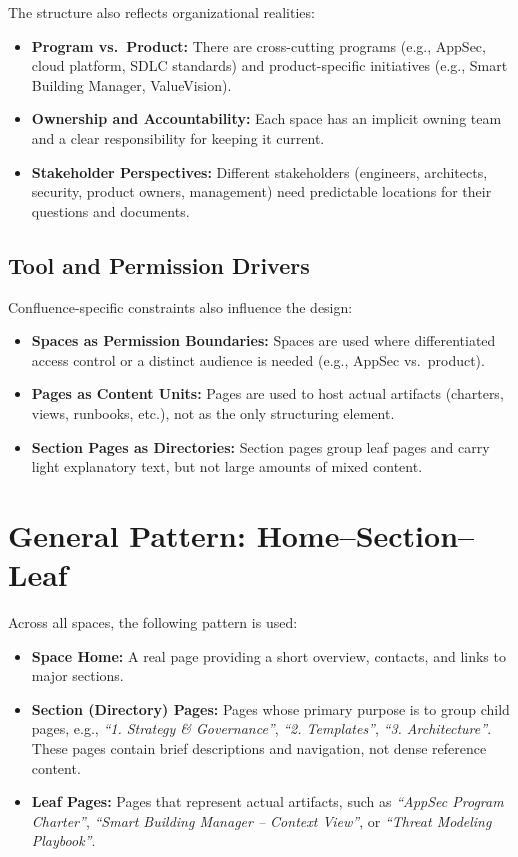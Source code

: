 \documentclass[11pt]{article}
\begin{document}
The structure also reflects organizational realities:

\begin{itemize}[leftmargin=*]
  \item \textbf{Program vs.\ Product:}
        There are cross-cutting programs (e.g., AppSec, cloud
        platform, SDLC standards) and product-specific initiatives
        (e.g., Smart Building Manager, ValueVision).
  \item \textbf{Ownership and Accountability:}
        Each space has an implicit owning team and a clear
        responsibility for keeping it current.
  \item \textbf{Stakeholder Perspectives:}
        Different stakeholders (engineers, architects, security,
        product owners, management) need predictable locations for
        their questions and documents.
\end{itemize}

\subsection{Tool and Permission Drivers}

Confluence-specific constraints also influence the design:

\begin{itemize}[leftmargin=*]
  \item \textbf{Spaces as Permission Boundaries:}
        Spaces are used where differentiated access control or a
        distinct audience is needed (e.g., AppSec vs.\ product).
  \item \textbf{Pages as Content Units:}
        Pages are used to host actual artifacts (charters, views,
        runbooks, etc.), not as the only structuring element.
  \item \textbf{Section Pages as Directories:}
        Section pages group leaf pages and carry light explanatory
        text, but not large amounts of mixed content.
\end{itemize}

\section{General Pattern: Home--Section--Leaf}

Across all spaces, the following pattern is used:

\begin{itemize}[leftmargin=*]
  \item \textbf{Space Home:} A real page providing a short overview,
        contacts, and links to major sections.
  \item \textbf{Section (Directory) Pages:} Pages whose primary
        purpose is to group child pages, e.g.,
        \emph{``1. Strategy \& Governance''}, \emph{``2. Templates''},
        \emph{``3. Architecture''}. These pages contain brief
        descriptions and navigation, not dense reference content.
  \item \textbf{Leaf Pages:} Pages that represent actual artifacts,
        such as \emph{``AppSec Program Charter''},
        \emph{``Smart Building Manager -- Context View''}, or
        \emph{``Threat Modeling Playbook''}.
\end{itemize}
\end{document}
